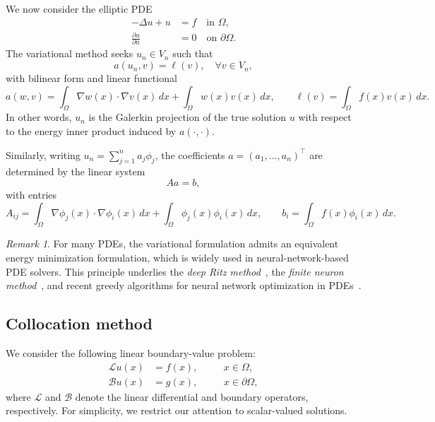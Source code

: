 \documentclass{article}
\theoremstyle{remark}
\newtheorem{remark}{Remark}
\begin{document}
We now consider the elliptic PDE
\begin{align*}
- \Delta u + u &= f \quad \text{in } \Omega, \\
\frac{\partial u}{\partial n} &= 0 \quad \text{on } \partial \Omega.
\end{align*}
The variational method seeks $u_n \in V_n$ such that
\begin{equation} \label{eq:variational-neumann}
a(u_n,v) = \ell(v), \quad \forall v \in V_n,    
\end{equation}
with bilinear form and linear functional
\[
a(w,v) = \int_\Omega \nabla w(x)\cdot \nabla v(x)\,dx 
+ \int_\Omega w(x) v(x)\,dx, 
\qquad 
\ell(v) = \int_\Omega f(x) v(x)\,dx .
\]
In other words, $u_n$ is the Galerkin projection of the true solution $u$ 
with respect to the energy inner product induced by $a(\cdot,\cdot)$. 

Similarly, writing $u_n = \sum_{j=1}^n a_j \phi_j$, 
the coefficients $a=(a_1,\dots,a_n)^\top$ are determined by the linear system
\[
A a = b,
\]
with entries
\[
A_{ij} = \int_\Omega \nabla \phi_j(x)\cdot \nabla \phi_i(x)\,dx 
+ \int_\Omega \phi_j(x)\phi_i(x)\,dx, 
\qquad
b_i = \int_\Omega f(x)\phi_i(x)\,dx .
\]

\begin{remark}
For many PDEs, the variational formulation admits an equivalent energy minimization formulation, which is widely used in neural-network-based PDE solvers.
This principle underlies the \emph{deep Ritz method}~\cite{EY:2018},
the \emph{finite neuron method}~\cite{Xu:2020},
and recent greedy algorithms for neural network optimization in PDEs~\cite{siegel2023greedy,XX:2025}.
\end{remark}

\subsection{Collocation method}
We consider the following linear boundary-value problem:
\begin{equation}\label{model_pde}
\begin{aligned}
     \mathcal{L}u(x) & = f(x), \quad && x \in \Omega, \\
     \mathcal{B}u(x) & = g(x), \quad && x \in \partial \Omega, 
\end{aligned}
\end{equation}
where $\mathcal{L}$ and $\mathcal{B}$ denote the linear differential and boundary operators, respectively. 
For simplicity, we restrict our attention to scalar-valued solutions. 
\end{document}

